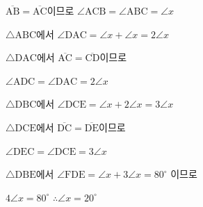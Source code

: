 $\overline{\mathrm{AB}} = \overline{\mathrm{AC}}$이므로 $\angle\mathrm{ACB} = \angle\mathrm{ABC} = \angle x$

$\triangle\mathrm{ABC}$에서 $\angle\mathrm{DAC} = \angle x + \angle x = 2\angle x$

$\triangle\mathrm{DAC}$에서 $\overline{\mathrm{AC}} = \overline{\mathrm{CD}}$이므로

$\angle\mathrm{ADC} = \angle\mathrm{DAC} = 2\angle x$

$\triangle\mathrm{DBC}$에서 $\angle\mathrm{DCE} = \angle x + 2\angle x = 3\angle x$

$\triangle\mathrm{DCE}$에서 $\overline{\mathrm{DC}} = \overline{\mathrm{DE}}$이므로

$\angle\mathrm{DEC} = \angle\mathrm{DCE} = 3\angle x$

$\triangle\mathrm{DBE}$에서 $\angle\mathrm{FDE} = \angle x + 3\angle x = 80^\circ$ 이므로

$4\angle x = 80^\circ$ $\therefore \angle x = 20^\circ$
